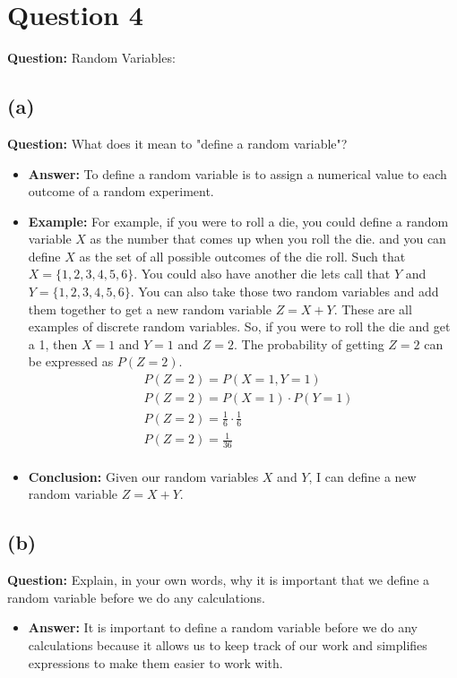 \documentclass{article}
\begin{document}
\section*{Question 4}
\textbf{Question:} Random Variables:
\subsection*{(a)} \textbf{Question:} What does it mean to "define a random variable"?
\begin{itemize}
    \item[] \textbf{Answer:} To define a random variable is to assign a numerical value to each outcome of a random experiment.
    \item[] \textbf{Example:} For example, if you were to roll a die, you could define a random variable $X$ as the number that comes up when you roll the die. 
    and you can define $X$ as the set of all possible outcomes of the die roll. Such that $X = \{1, 2, 3, 4, 5, 6\}$. You could also have another die lets call that 
    $Y$ and $Y = \{1, 2, 3, 4, 5, 6\}$. You can also take those two random variables and add them together to get a new random variable $Z = X + Y$. These are all 
    examples of discrete random variables. So, if you were to roll the die and get a 1, then $X = 1$ and $Y = 1$ and $Z = 2$. The probability of getting $Z = 2$ can be expressed as $P(Z = 2)$.
    \begin{equation*}
        \begin{aligned}
        &P(Z = 2) = P(X = 1, Y = 1) \\
        &P(Z = 2) = P(X = 1) \cdot P(Y = 1) \\
        &P(Z = 2) = \frac{1}{6} \cdot \frac{1}{6} \\
        &P(Z = 2) = \frac{1}{36} \\
        \end{aligned}
    \end{equation*}
    \item[] \textbf{Conclusion:} Given our random variables $X$ and $Y$, I can define a new random variable $Z = X + Y$.
\end{itemize}
\subsection*{(b)} \textbf{Question:} Explain, in your own words, why it is important that we define a random variable
before we do any calculations. 
\begin{itemize}
    \item[] \textbf{Answer:} It is important to define a random variable before we do any calculations because it allows us to keep track of our work and simplifies expressions to make them easier to work with.
\end{itemize}
\end{document}
